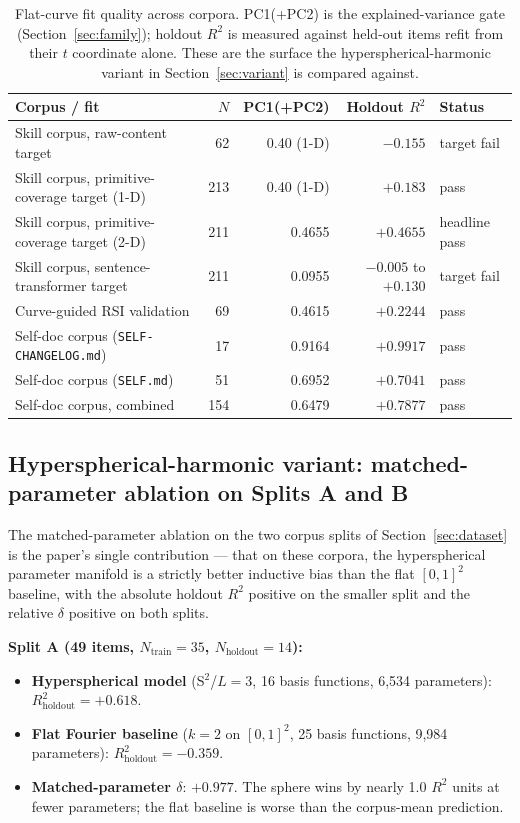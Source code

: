 \documentclass[11pt,a4paper]{article}
\begin{document}
\begin{table}[h]
\centering
\begin{tabular}{@{}lrrrl@{}}
\toprule
Corpus / fit & $N$ & PC1(+PC2) & Holdout $R^2$ & Status \\
\midrule
Skill corpus, raw-content target & 62  & 0.40 (1-D) & $-0.155$  & target fail \\
Skill corpus, primitive-coverage target (1-D) & 213 & 0.40 (1-D) & $+0.183$  & pass \\
Skill corpus, primitive-coverage target (2-D) & 211 & 0.4655     & $+0.4655$ & headline pass \\
Skill corpus, sentence-transformer target & 211 & 0.0955     & $-0.005$ to $+0.130$ & target fail \\
Curve-guided RSI validation & 69  & 0.4615     & $+0.2244$ & pass \\
Self-doc corpus (\texttt{SELF-CHANGELOG.md}) & 17 & 0.9164     & $+0.9917$ & pass \\
Self-doc corpus (\texttt{SELF.md}) & 51 & 0.6952 & $+0.7041$ & pass \\
Self-doc corpus, combined & 154 & 0.6479 & $+0.7877$ & pass \\
\bottomrule
\end{tabular}
\caption{Flat-curve fit quality across corpora. PC1(+PC2) is the explained-variance gate (Section~\ref{sec:family}); holdout $R^2$ is measured against held-out items refit from their $t$ coordinate alone. These are the surface the hyperspherical-harmonic variant in Section~\ref{sec:variant} is compared against.}
\label{tab:context}
\end{table}

\subsection{Hyperspherical-harmonic variant: matched-parameter ablation on Splits A and B}

The matched-parameter ablation on the two corpus splits of Section~\ref{sec:dataset} is the paper's single contribution --- that on these corpora, the hyperspherical parameter manifold is a strictly better inductive bias than the flat $[0,1]^2$ baseline, with the absolute holdout $R^2$ positive on the smaller split and the relative $\delta$ positive on both splits.

\textbf{Split A (49 items, $N_{\mathrm{train}}=35$, $N_{\mathrm{holdout}}=14$):}
\begin{itemize}
\item \textbf{Hyperspherical model} (S$^2$/$L{=}3$, 16 basis functions, 6,534 parameters): $R^2_{\mathrm{holdout}} = +0.618$.
\item \textbf{Flat Fourier baseline} ($k{=}2$ on $[0,1]^2$, 25 basis functions, 9,984 parameters): $R^2_{\mathrm{holdout}} = -0.359$.
\item \textbf{Matched-parameter $\delta$}: $+0.977$. The sphere wins by nearly 1.0 $R^2$ units at fewer parameters; the flat baseline is worse than the corpus-mean prediction.
\end{itemize}
\end{document}
